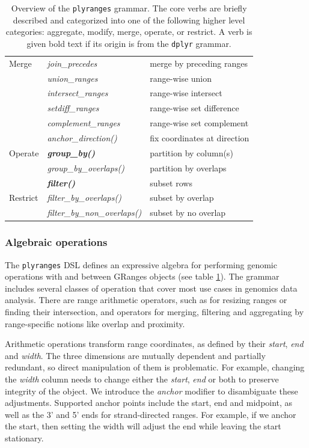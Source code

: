 \documentclass[]{article}
\begin{document}
\begin{table}[!htbp]
\begin{tabular}{|l|l|p{6cm}|}
    Merge & \emph{join\_precedes} & merge by preceding ranges \\
    & \emph{union\_ranges} & range-wise union \\
    & \emph{intersect\_ranges} & range-wise intersect \\
    & \emph{setdiff\_ranges} & range-wise set difference \\
    & \emph{complement\_ranges} & range-wise set complement \\
  \hline
   & \emph{anchor\_direction()} & fix coordinates at direction \\
  Operate & \textbf{\emph{group\_by()}} & partition by column(s)  \\ 
   & \emph{group\_by\_overlaps()} & partition by overlaps \\
   \hline
   & \textbf{\emph{filter()}} & subset rows \\
  Restrict & \emph{filter\_by\_overlaps()} & subset by overlap \\
    & \emph{filter\_by\_non\_overlaps()} & subset by no overlap \\
   \hline
\end{tabular}
\caption{Overview of the \texttt{plyranges} grammar. The core verbs are
briefly described and categorized into one of the following higher level 
categories: aggregate, modify, merge, operate, or restrict. A verb is given bold text if
its origin is from the \texttt{dplyr} grammar.}\label{tab:grammar}
\end{table}

\hypertarget{algebraic-operations}{%
\subsubsection{Algebraic operations}\label{algebraic-operations}}

The \texttt{plyranges} DSL defines an expressive algebra for performing
genomic operations with and between GRanges objects (see table
\ref{tab:grammar}). The grammar includes several classes of operation
that cover most use cases in genomics data analysis. There are range
arithmetic operators, such as for resizing ranges or finding their
intersection, and operators for merging, filtering and aggregating by
range-specific notions like overlap and proximity.

Arithmetic operations transform range coordinates, as defined by their
\emph{start}, \emph{end} and \emph{width}. The three dimensions are
mutually dependent and partially redundant, so direct manipulation of
them is problematic. For example, changing the \emph{width} column needs
to change either the \emph{start}, \emph{end} or both to preserve
integrity of the object. We introduce the \emph{anchor} modifier to
disambiguate these adjustments. Supported anchor points include the
start, end and midpoint, as well as the 3' and 5' ends for
strand-directed ranges. For example, if we anchor the start, then
setting the width will adjust the end while leaving the start
stationary.
\end{document}
